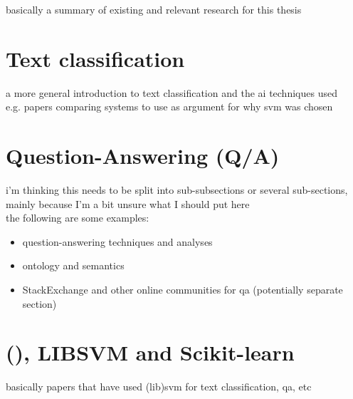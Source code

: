 \label{chap:chapter2}
basically a summary of existing and relevant research for this thesis

\section{Text classification}
\label{sec:text_classification}
a more general introduction to text classification and the \gls{ai} techniques used \\
e.g. papers comparing systems to use as argument for why svm was chosen

\section{Question-Answering (Q/A)}
\label{sec:question_answering}
i'm thinking this needs to be split into sub-subsections or several sub-sections, mainly because I'm a bit unsure what I should put here \\
the following are some examples: 
\begin{itemize}
	\item question-answering techniques and analyses
	\item ontology and semantics
	\item StackExchange and other online communities for qa (potentially separate section)
\end{itemize}

\section{ (), LIBSVM and Scikit-learn}
\label{sec:libsvm}
basically papers that have used (lib)svm for text classification, qa, etc
